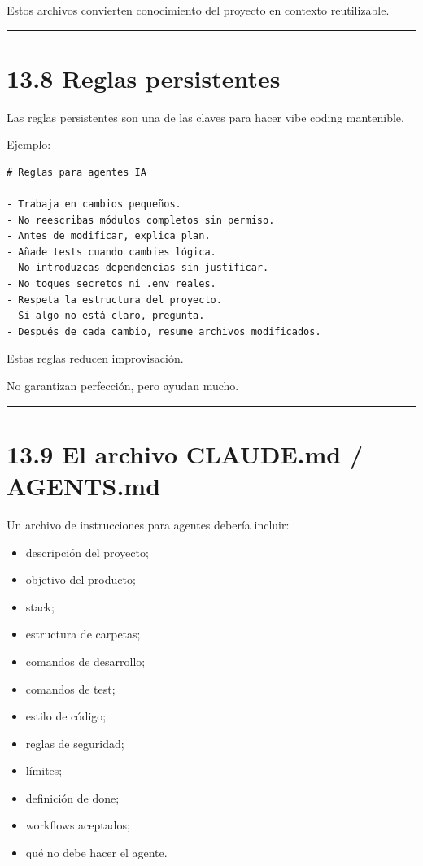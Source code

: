 Estos archivos convierten conocimiento del proyecto en contexto
reutilizable.

\begin{center}\rule{0.5\linewidth}{0.5pt}\end{center}

\section{13.8 Reglas persistentes}\label{reglas-persistentes}

Las reglas persistentes son una de las claves para hacer vibe coding
mantenible.

Ejemplo:

\begin{lstlisting}
# Reglas para agentes IA

- Trabaja en cambios pequeños.
- No reescribas módulos completos sin permiso.
- Antes de modificar, explica plan.
- Añade tests cuando cambies lógica.
- No introduzcas dependencias sin justificar.
- No toques secretos ni .env reales.
- Respeta la estructura del proyecto.
- Si algo no está claro, pregunta.
- Después de cada cambio, resume archivos modificados.
\end{lstlisting}

Estas reglas reducen improvisación.

No garantizan perfección, pero ayudan mucho.

\begin{center}\rule{0.5\linewidth}{0.5pt}\end{center}

\section{13.9 El archivo CLAUDE.md /
AGENTS.md}\label{el-archivo-claude.md-agents.md}

Un archivo de instrucciones para agentes debería incluir:

\begin{itemize}
\tightlist
\item
  descripción del proyecto;
\item
  objetivo del producto;
\item
  stack;
\item
  estructura de carpetas;
\item
  comandos de desarrollo;
\item
  comandos de test;
\item
  estilo de código;
\item
  reglas de seguridad;
\item
  límites;
\item
  definición de done;
\item
  workflows aceptados;
\item
  qué no debe hacer el agente.
\end{itemize}

